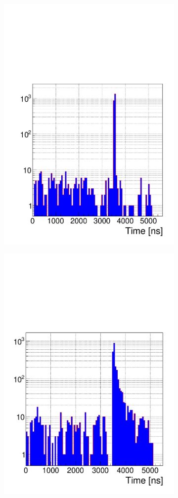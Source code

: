     \begin{figure}[H]
		\begin{subfigure}{.5\linewidth}
		    \centering
			\includegraphics[width = .8\linewidth]{fig/chapt6/Muon-Time-Profile-gRPC-CMS-FEB.pdf}
			\caption{\label{fig:time-profiles:A}}
		\end{subfigure}
		\begin{subfigure}{.5\linewidth}
		    \centering
			\includegraphics[width = .8\linewidth]{fig/chapt6/Muon-Time-Profile-gRPC-INFN.pdf}

\end{subfigure}
\end{figure}
